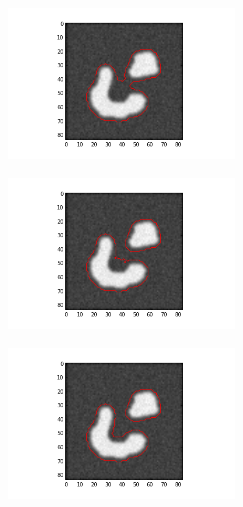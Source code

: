 \documentclass[12pt,fleqn]{article}\usepackage{../common}
\begin{document}
\includegraphics[height=4cm]{level_2_50.png}

\includegraphics[height=4cm]{level_2_60.png}

\includegraphics[height=4cm]{level_2_70.png}
\end{document}
